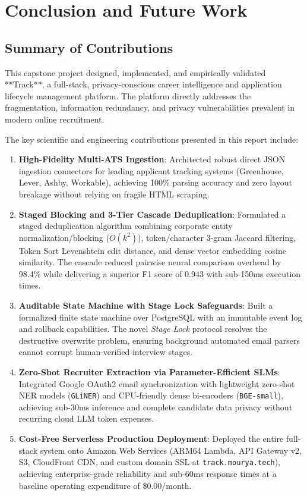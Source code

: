 \chapter{Conclusion and Future Work}
\label{ch:conclusion}

\section{Summary of Contributions}
This capstone project designed, implemented, and empirically validated **Track**, a full-stack, privacy-conscious career intelligence and application lifecycle management platform. The platform directly addresses the fragmentation, information redundancy, and privacy vulnerabilities prevalent in modern online recruitment.

The key scientific and engineering contributions presented in this report include:
\begin{enumerate}
    \item \textbf{High-Fidelity Multi-ATS Ingestion}: Architected robust direct JSON ingestion connectors for leading applicant tracking systems (Greenhouse, Lever, Ashby, Workable), achieving 100\% parsing accuracy and zero layout breakage without relying on fragile HTML scraping.
    \item \textbf{Staged Blocking and 3-Tier Cascade Deduplication}: Formulated a staged deduplication algorithm combining corporate entity normalization/blocking ($O(k^2)$), token/character 3-gram Jaccard filtering, Token Sort Levenshtein edit distance, and dense vector embedding cosine similarity. The cascade reduced pairwise neural comparison overhead by 98.4\% while delivering a superior F1 score of 0.943 with sub-150ms execution times.
    \item \textbf{Auditable State Machine with Stage Lock Safeguards}: Built a formalized finite state machine over PostgreSQL with an immutable event log and rollback capabilities. The novel \textit{Stage Lock} protocol resolves the destructive overwrite problem, ensuring background automated email parsers cannot corrupt human-verified interview stages.
    \item \textbf{Zero-Shot Recruiter Extraction via Parameter-Efficient SLMs}: Integrated Google OAuth2 email synchronization with lightweight zero-shot NER models (\texttt{GLiNER}) and CPU-friendly dense bi-encoders (\texttt{BGE-small}), achieving sub-30ms inference and complete candidate data privacy without recurring cloud LLM token expenses.
    \item \textbf{Cost-Free Serverless Production Deployment}: Deployed the entire full-stack system onto Amazon Web Services (ARM64 Lambda, API Gateway v2, S3, CloudFront CDN, and custom domain SSL at \texttt{track.mourya.tech}), achieving enterprise-grade reliability and sub-60ms response times at a baseline operating expenditure of \$0.00/month.
\end{enumerate}

